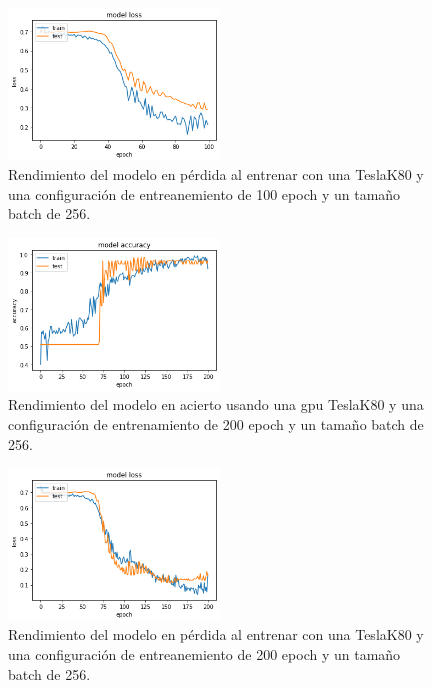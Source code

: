 \begin{figure}
    \centering
    \includegraphics[width=0.5\textwidth]{images/chapter5/batch_256_100_epoch_loss.png}
    \caption{Rendimiento del modelo en pérdida al entrenar con una TeslaK80 y una configuración de entreanemiento de 100 epoch y un tamaño batch de 256.}
    \label{fig:Resultados de loss en el entrenamiento con un batch-size de 256 y 100 epochs}
\end{figure}

\begin{figure}
    \centering
    \includegraphics[width=0.5\textwidth]{images/chapter5/batch_256_200_epoch.png}
    \caption{Rendimiento del modelo en acierto usando una gpu TeslaK80 y una configuración de entrenamiento de 200 epoch y un tamaño batch de 256.}
    \label{fig:Resultados de la precisión de entrenamiento con un batch-size de 256 y 200 epochs}
\end{figure}

\begin{figure}
    \centering
    \includegraphics[width=0.5\textwidth]{images/chapter5/batch_256_200_epoch_loss.png}
    \caption{Rendimiento del modelo en pérdida al entrenar con una TeslaK80 y una configuración de entreanemiento de 200 epoch y un tamaño batch de 256.}
    \label{fig:Resultados de loss en el entrenamiento con un batch-size de 256 y 200 epochs}
\end{figure}


